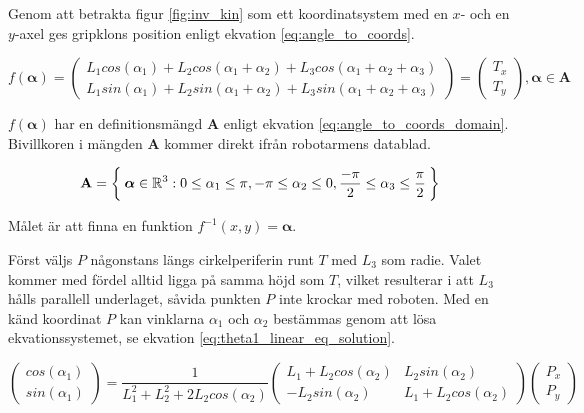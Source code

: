 
Genom att betrakta figur \ref{fig:inv_kin} som ett koordinatsystem med en $x$- och en $y$-axel ges gripklons position enligt ekvation \ref{eq:angle_to_coords}.

\begin{equation}
	\label{eq:angle_to_coords}
	f(\boldsymbol{\alpha})
	=
	\begin{pmatrix}
		L_{1}cos(\alpha_{1}) + L_{2}cos(\alpha_{1} + \alpha_{2}) + L_{3}cos(\alpha_{1} + \alpha_{2} + \alpha_{3})\\
		L_{1}sin(\alpha_{1}) + L_{2}sin(\alpha_{1} + \alpha_{2}) + L_{3}sin(\alpha_{1} + \alpha_{2} + \alpha_{3})
	\end{pmatrix}
	=
	\begin{pmatrix}
		T_x \\
		T_y
	\end{pmatrix}
	,
	\boldsymbol{\alpha}
	\in
	\mathbf{A}
\end{equation}

$f(\boldsymbol{\alpha})$ har en definitionsmängd $\mathbf{A}$ enligt ekvation \ref{eq:angle_to_coords_domain}. Bivillkoren i mängden $\mathbf{A}$ kommer direkt ifrån robotarmens datablad.

\begin{equation}
	\label{eq:angle_to_coords_domain}
	\mathbf{A}
	=
	\Set{
		\boldsymbol{\alpha} \in \mathbb{R}^{3} :
			0 \leq \alpha_1 \leq \pi,
			-\pi \leq \alpha_2 \leq 0,
			\frac{-\pi}{2} \leq \alpha_3 \leq \frac{\pi}{2}}
\end{equation}

Målet är att finna en funktion $f^{-1}(x, y) = \boldsymbol{\alpha}$.

Först väljs $P$ någonstans längs cirkelperiferin runt $T$ med $L_3$ som radie. Valet kommer med fördel alltid ligga på samma höjd som $T$, vilket resulterar i att $L_3$ hålls parallell underlaget, såvida punkten $P$ inte krockar med roboten. Med en känd koordinat $P$ kan vinklarna $\alpha_{1}$ och $\alpha_{2}$ bestämmas genom att lösa ekvationssystemet, se ekvation \ref{eq:theta1_linear_eq_solution}.

\begin{equation}
	\label{eq:theta1_linear_eq_solution}
	\begin{pmatrix}
		cos(\alpha_{1})\\
		sin(\alpha_{1})
	\end{pmatrix}
	=
	\frac{1}{L_1^2 + L_2^2 + 2 L_2 cos(\alpha_{2})}
	\begin{pmatrix}
		L_1 + L_2 cos(\alpha_{2}) & L_2 sin(\alpha_{2})\\
		-L_2 sin(\alpha_{2}) & L_1 + L_2 cos(\alpha_{2})
	\end{pmatrix}
	\begin{pmatrix}
		P_x \\
		P_y
	\end{pmatrix}
\end{equation}

